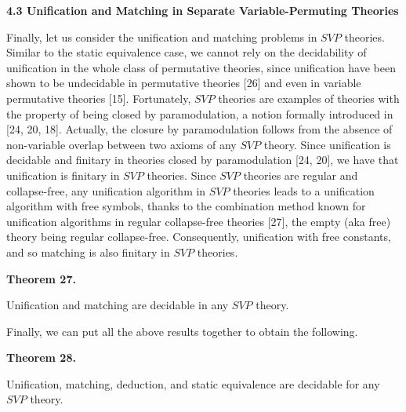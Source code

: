  
 
\par\medskip\noindent\textbf{4.3 Unification and Matching in Separate Variable-Permuting Theories}\par
 
 
Finally, let us consider the unification and matching problems in $\mathit{SVP}$ theories. Similar to the static equivalence case, we cannot rely on the decidability of unification in the whole class of permutative theories, since unification have been shown to be undecidable in permutative theories [26] and even in variable permutative theories [15]. Fortunately, $\mathit{SVP}$ theories are examples of theories with the property of being closed by paramodulation, a notion formally introduced in [24, 20, 18]. Actually, the closure by paramodulation follows from the absence of non-variable overlap between two axioms of any $\mathit{SVP}$ theory. Since unification is decidable and finitary in theories closed by paramodulation [24, 20], we have that unification is finitary in $\mathit{SVP}$ theories. Since $\mathit{SVP}$ theories are regular and collapse-free, any unification algorithm in $\mathit{SVP}$ theories leads to a unification algorithm with free symbols, thanks to the combination method known for unification algorithms in regular collapse-free theories [27], the empty (aka free) theory being regular collapse-free. Consequently, unification with free constants, and so matching is also finitary in $\mathit{SVP}$ theories.\par
 
 
 
\par\medskip\noindent\textbf{Theorem 27.}\par
 
 
Unification and matching are decidable in any $\mathit{SVP}$ theory.\par
 
 
 
 
Finally, we can put all the above results together to obtain the following.\par
 
 
 
\par\medskip\noindent\textbf{Theorem 28.}\par
 
 
Unification, matching, deduction, and static equivalence are decidable for any $\mathit{SVP}$ theory.\par
 
 
 
 
